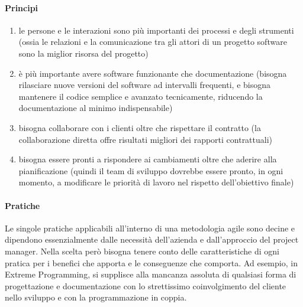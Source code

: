 \documentclass[11pt,a4paper]{book}
\begin{document}
\paragraph{Principi}
\begin{enumerate}
	\item le persone e le interazioni sono più importanti dei processi e degli strumenti (ossia le relazioni e la comunicazione tra gli attori di un progetto software sono la miglior risorsa del progetto)
	\item è più importante avere software funzionante che documentazione (bisogna rilasciare nuove versioni del software ad intervalli frequenti, e bisogna mantenere il codice semplice e avanzato tecnicamente, riducendo la documentazione al minimo indispensabile)
	\item bisogna collaborare con i clienti oltre che rispettare il contratto (la collaborazione diretta offre risultati migliori dei rapporti contrattuali)
	\item bisogna essere pronti a rispondere ai cambiamenti oltre che aderire alla pianificazione (quindi il team di sviluppo dovrebbe essere pronto, in ogni momento, a modificare le priorità di lavoro nel rispetto dell'obiettivo finale)
\end{enumerate}

\paragraph{Pratiche}
Le singole pratiche applicabili all'interno di una metodologia agile sono decine e dipendono essenzialmente dalle necessità dell'azienda e dall'approccio del project manager. Nella scelta però bisogna tenere conto delle caratteristiche di ogni pratica per i benefici che apporta e le conseguenze che comporta. Ad esempio, in Extreme Programming, si supplisce alla mancanza assoluta di qualsiasi forma di progettazione e documentazione con lo strettissimo coinvolgimento del cliente nello sviluppo e con la programmazione in coppia.
\end{document}
